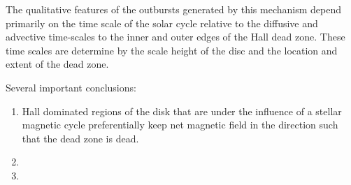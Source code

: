 The qualitative features of the outbursts generated by this mechanism depend primarily on the time scale of the solar cycle relative to the diffusive and advective time-scales to the inner and outer edges of the Hall dead zone.  These time scales are determine by the scale height of the disc and the location and extent of the dead zone.

Several important conclusions:
\begin{enumerate}
\item{Hall dominated regions of the disk that are under the influence of a stellar magnetic cycle preferentially keep net magnetic field in the direction such that the dead zone is dead.}
\item{}
\item{}
\end{enumerate}

















